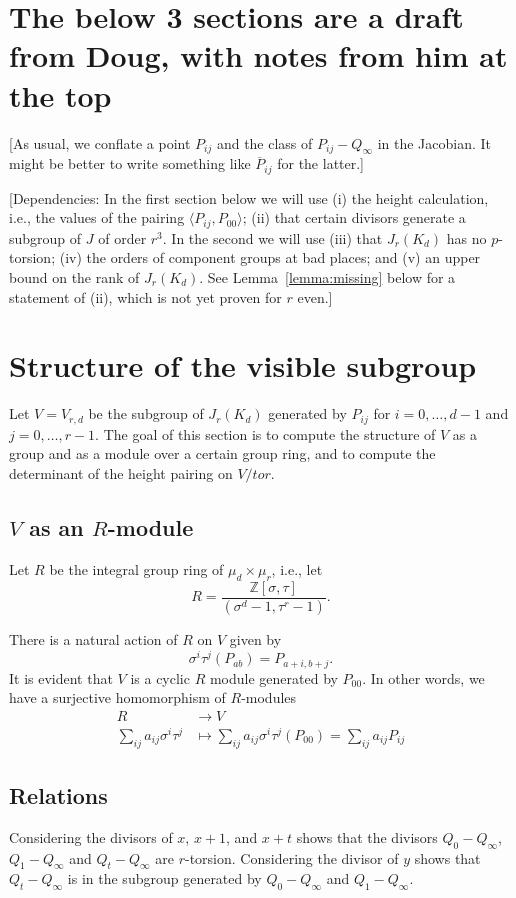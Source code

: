\documentclass[reqno]{amsart}
\theoremstyle{definition}
\theoremstyle{remark}
\def\Z{\mathbb{Z}}
\begin{document}
\section*{The below 3 sections are a draft from Doug, with notes from him at the top}

[As usual, we conflate a point $P_{ij}$ and the class of
$P_{ij}-Q_\infty$ in the Jacobian.  It might be better to write
something like $\overline P_{ij}$ for the latter.]

[Dependencies: In the first section below we will use (i) the height
calculation, i.e., the values of the pairing $\langle
P_{ij},P_{00}\rangle$; (ii) that certain divisors generate a subgroup
of $J$ of order $r^3$.  In the second we will use (iii) that
$J_r(K_d)$ has no $p$-torsion; (iv) the orders of component groups at
bad places; and (v) an upper bound on the rank of $J_r(K_d)$.  See
Lemma~\ref{lemma:missing} below for a statement of (ii), which is not
yet proven for $r$ even.]


\section{Structure of the visible subgroup}
Let $V=V_{r,d}$ be the subgroup of $J_r(K_d)$ generated by $P_{ij}$
for $i=0,\dots,d-1$ and $j=0,\dots,r-1$.  The goal of this section is
to compute the structure of $V$ as a group and as a module over
a certain group ring, and to compute the determinant of the height
pairing on $V/tor$.

\subsection{$V$ as an $R$-module}
Let $R$ be the integral group ring of $\mu_d\times\mu_r$, i.e., let
$$R=\frac{\Z[\sigma,\tau]}{(\sigma^d-1,\tau^r-1)}.$$

There is a natural action of $R$ on $V$ given by 
$$\sigma^i\tau^j(P_{ab})=P_{a+i,b+j}.$$
It is evident that $V$ is a cyclic $R$ module generated by $P_{00}$.
In other words, we have a surjective homomorphism of $R$-modules
\begin{align*}
R&\to V\\
\sum_{ij}a_{ij}\sigma^i\tau^j&\mapsto
\sum_{ij}a_{ij}\sigma^i\tau^j(P_{00})
=\sum_{ij}a_{ij} P_{ij}
\end{align*}


\subsection{Relations}
Considering the divisors of $x$, $x+1$, and $x+t$ shows that the
divisors $Q_0-Q_\infty$, $Q_1-Q_\infty$ and $Q_t-Q_\infty$ are
$r$-torsion.  Considering the divisor of $y$ shows that $Q_t-Q_\infty$ is in
the subgroup generated by $Q_0-Q_\infty$ and $Q_1-Q_\infty$.  
\end{document}
